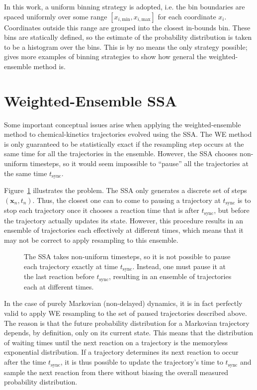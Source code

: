 \documentclass[english,letterpaper,12pt]{report}
\renewcommand{\vec}[1]{\ensuremath{\mathbf{#1}}}
\begin{document}
\begin{doublespacing}
In this work, a uniform binning strategy is adopted, i.e. the bin boundaries are spaced uniformly over some range $[x_{i,\text{min}}, x_{i,\text{max}}]$ for each coordinate $x_i$. Coordinates outside this range are grouped into the closest in-bounds bin. These bins are statically defined, so the estimate of the probability distribution is taken to be a histogram over the bins. This is by no means the only strategy possible; \cite{we-exact} gives more examples of binning strategies to show how general the weighted-ensemble method is.


\section{Weighted-Ensemble SSA} %
\label{sub:wessa}

Some important conceptual issues arise when applying the weighted-ensemble method to chemical-kinetics trajectories evolved using the SSA. The WE method is only guaranteed to be statistically exact if the resampling step occurs at the same time for all the trajectories in the ensemble. However, the SSA chooses non-uniform timesteps, so it would seem impossible to ``pause'' all the trajectories at the same time $t_\text{sync}$. 

Figure~\ref{fig:wessa-pause} illustrates the problem. The SSA only generates a discrete set of steps $(\vec{x}_n, t_n)$. Thus, the closest one can to come to pausing a trajectory at $t_\text{sync}$ is to stop each trajectory once it chooses a reaction time that is after $t_\text{sync}$, but before the trajectory actually updates its state. However, this procedure results in an ensemble of trajectories each effectively at different times, which means that it may not be correct to apply resampling to this ensemble.

\begin{figure}[ht]
    \centering
    \def\svgwidth{0.65\textwidth}
    
    \caption{The SSA takes non-uniform timesteps, so it is not possible to pause each trajectory exactly at time $t_\text{sync}$. Instead, one must pause it at the last reaction before $t_\text{sync}$, resulting in an ensemble of trajectories each at different times.}
    \label{fig:wessa-pause}
\end{figure}

In the case of purely Markovian (non-delayed) dynamics, it is in fact perfectly valid to apply WE resampling to the set of paused trajectories described above. The reason is that the future probability distribution for a Markovian trajectory depends, by definition, only on its current state. This means that the distribution of waiting times until the next reaction on a trajectory is the memoryless exponential distribution. If a trajectory determines its next reaction to occur after the time $t_\text{sync}$, it is thus possible to update the trajectory's time to $t_\text{sync}$ and sample the next reaction from there without biasing the overall measured probability distribution.


\end{doublespacing}
\end{document}
